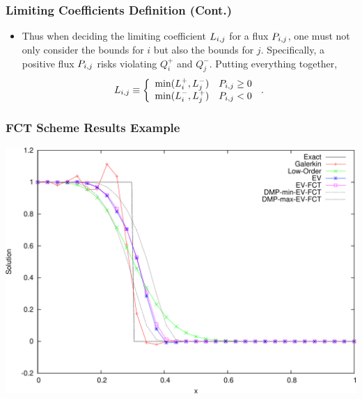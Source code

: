 \documentclass{beamer} \useoutertheme{infolines}
\begin{document}
\begin{frame}
\frametitle{Limiting Coefficients Definition (Cont.)}

\begin{itemize}
   \item Thus when deciding the limiting coefficient $L_{i,j}$ for a flux $\correctionfluxij$, 
      one must not only consider the bounds for $i$ but also the bounds for $j$.
      Specifically, a positive flux $\correctionfluxij$ risks violating $Q_i^+$ and $Q_j^-$.
      Putting everything together,
      \begin{equation}
         L\ij \equiv\left\{
            \begin{array}{l l}
               \min(L_i^+,L_j^-) & \correctionfluxij \geq 0\\
               \min(L_i^-,L_j^+) & \correctionfluxij < 0
            \end{array}
            \right. \eqp
      \end{equation}
\end{itemize}

\end{frame}
\begin{frame}
\frametitle{FCT Scheme Results Example}

\includegraphics[width=\textwidth]{./figures/advection_FCT.pdf}

\end{frame}
\end{document}
